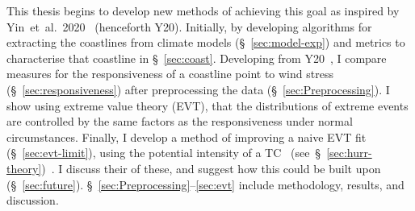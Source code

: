 This thesis begins to develop new methods of achieving this goal
as inspired by Yin~et~al.~2020~\cite{ZannaPreprint} (henceforth Y20).
Initially, by developing algorithms for extracting
the coastlines from climate models (§~\ref{sec:model-exp})
and metrics to characterise that coastline in §~\ref{sec:coast}.
Developing from Y20~\cite{ZannaPreprint}, I compare measures for the
responsiveness of a coastline point to wind stress (§~\ref{sec:responsiveness})
after preprocessing the data (§~\ref{sec:Preprocessing}).
I show using extreme value theory (EVT), that the
distributions of extreme events are controlled by the same factors as
the responsiveness under normal circumstances.
Finally, I develop a
method of improving a naive EVT fit (§~\ref{sec:evt-limit}),
using the potential intensity of a TC~\cite{emanuel1999thermodynamic}
(see~§~\ref{sec:hurr-theory})~\cite{emanuel1987dependence,
 emanuel2016predictability}.
I discuss their of these,
and suggest how this could be built upon (§~\ref{sec:future}).
§~\ref{sec:Preprocessing}--\ref{sec:evt} include methodology,
results, and discussion.
